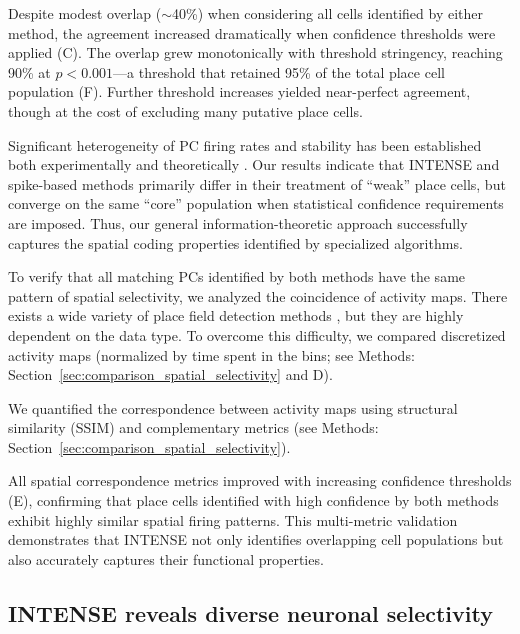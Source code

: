Despite modest overlap ($\sim$40\%) when considering all cells identified by either
method, the agreement increased dramatically when confidence thresholds were applied
(C). The overlap grew monotonically with threshold stringency, reaching
90\% at $p < 0.001$---a threshold that retained 95\% of the total place cell
population (F). Further threshold increases yielded near-perfect
agreement, though at the cost of excluding many putative place cells.

Significant heterogeneity of PC firing rates and stability has been established both
experimentally \cite{Mizuseki2012} and theoretically \cite{Lian2022}.
Our results indicate that INTENSE and spike-based methods primarily differ in their
treatment of ``weak'' place cells, but converge on the same ``core'' population when
statistical confidence requirements are imposed. Thus, our general
information-theoretic approach successfully captures the spatial coding properties
identified by specialized algorithms.


To verify that all matching PCs identified by both methods have the same pattern of
spatial selectivity, we analyzed the coincidence of activity maps. There exists a
wide variety of place field detection methods \cite{Grieves2017}, but they are
highly dependent on the data type. To overcome this difficulty, we compared
discretized activity maps (normalized by time spent in the bins; see Methods:
Section~\ref{sec:comparison_spatial_selectivity} and D).

We quantified the correspondence between activity maps using structural
similarity (SSIM) and complementary metrics (see Methods:
Section~\ref{sec:comparison_spatial_selectivity}).

All spatial correspondence metrics improved with increasing confidence thresholds
(E), confirming that place cells identified with high confidence by both
methods exhibit highly similar spatial firing patterns. This multi-metric
validation demonstrates that INTENSE not only identifies overlapping cell
populations but also accurately captures their functional properties.


\subsection{INTENSE reveals diverse neuronal selectivity}
\label{sec:intense_deciphers}

